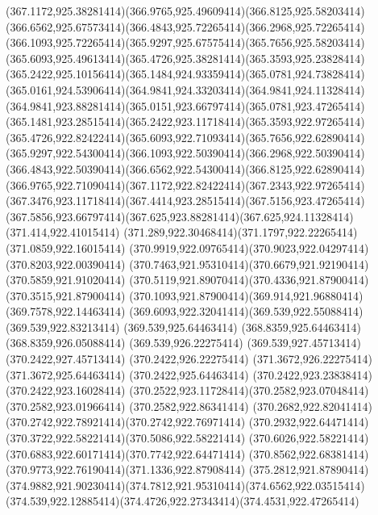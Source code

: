 {{	\curveto(367.1172,925.38281414)(366.9765,925.49609414)(366.8125,925.58203414)
	\curveto(366.6562,925.67573414)(366.4843,925.72265414)(366.2968,925.72265414)
	\curveto(366.1093,925.72265414)(365.9297,925.67575414)(365.7656,925.58203414)
	\curveto(365.6093,925.49613414)(365.4726,925.38281414)(365.3593,925.23828414)
	\curveto(365.2422,925.10156414)(365.1484,924.93359414)(365.0781,924.73828414)
	\curveto(365.0161,924.53906414)(364.9841,924.33203414)(364.9841,924.11328414)
	\curveto(364.9841,923.88281414)(365.0151,923.66797414)(365.0781,923.47265414)
	\curveto(365.1481,923.28515414)(365.2422,923.11718414)(365.3593,922.97265414)
	\curveto(365.4726,922.82422414)(365.6093,922.71093414)(365.7656,922.62890414)
	\curveto(365.9297,922.54300414)(366.1093,922.50390414)(366.2968,922.50390414)
	\curveto(366.4843,922.50390414)(366.6562,922.54300414)(366.8125,922.62890414)
	\curveto(366.9765,922.71090414)(367.1172,922.82422414)(367.2343,922.97265414)
	\curveto(367.3476,923.11718414)(367.4414,923.28515414)(367.5156,923.47265414)
	\curveto(367.5856,923.66797414)(367.625,923.88281414)(367.625,924.11328414)
	\closepath
	\moveto(371.414,922.41015414)
	\curveto(371.289,922.30468414)(371.1797,922.22265414)(371.0859,922.16015414)
	\curveto(370.9919,922.09765414)(370.9023,922.04297414)(370.8203,922.00390414)
	\curveto(370.7463,921.95310414)(370.6679,921.92190414)(370.5859,921.91020414)
	\curveto(370.5119,921.89070414)(370.4336,921.87900414)(370.3515,921.87900414)
	\curveto(370.1093,921.87900414)(369.914,921.96880414)(369.7578,922.14463414)
	\curveto(369.6093,922.32041414)(369.539,922.55088414)(369.539,922.83213414)
	\lineto(369.539,925.64463414)
	\lineto(368.8359,925.64463414)
	\lineto(368.8359,926.05088414)
	\lineto(369.539,926.22275414)
	\lineto(369.539,927.45713414)
	\lineto(370.2422,927.45713414)
	\lineto(370.2422,926.22275414)
	\lineto(371.3672,926.22275414)
	\lineto(371.3672,925.64463414)
	\lineto(370.2422,925.64463414)
	\lineto(370.2422,923.23838414)
	\lineto(370.2422,923.16028414)
	\curveto(370.2522,923.11728414)(370.2582,923.07048414)(370.2582,923.01966414)
	\lineto(370.2582,922.86341414)
	\curveto(370.2682,922.82041414)(370.2742,922.78921414)(370.2742,922.76971414)
	\curveto(370.2932,922.64471414)(370.3722,922.58221414)(370.5086,922.58221414)
	\curveto(370.6026,922.58221414)(370.6883,922.60171414)(370.7742,922.64471414)
	\curveto(370.8562,922.68381414)(370.9773,922.76190414)(371.1336,922.87908414)
	\closepath
	\moveto(375.2812,921.87890414)
	\curveto(374.9882,921.90230414)(374.7812,921.95310414)(374.6562,922.03515414)
	\curveto(374.539,922.12885414)(374.4726,922.27343414)(374.4531,922.47265414)
}}
